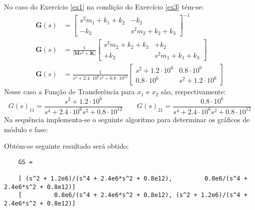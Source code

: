 \documentclass{article}
\begin{document}
\begin{resolution}
    No caso do Exercício \ref{ex1} na condição do Exercício \ref{ex3} tém-se:
    \begin{align*}
        \mathbf{G}(s) &= \begin{bmatrix} s^2 m_1 + k_1 + k_2 & -k_2\\ -k_2 & s^2 m_2 + k_2 + k_3\end{bmatrix}^{-1}\\
        \mathbf{G}(s) &= 
        \frac{1}{|\mathbf{M}s^2 + \mathbf{K}|}
        \begin{bmatrix} s^2 m_2 + k_2 + k_3 & +k_2\\ +k_2 & s^2 m_1 + k_1 + k_3\end{bmatrix}\\
        \mathbf{G}(s) &= 
        \frac{1}{s^4 + 2.4\cdot 10^6 s^2 + 0.8\cdot 10^{12}}
        \begin{bmatrix} s^2 + 1.2\cdot 10^6 & 0.8\cdot 10^6\\ 0.8\cdot 10^6 & s^2 + 1.2\cdot 10^6\end{bmatrix}
    \end{align*}
    Nesse caso a Função de Transferência para $x_1$ e $x_2$ são, respectivamente:
    \begin{equation*}
        \boxed{G(s)_{11} = \frac{s^2 + 1.2\cdot 10^6}{s^4 + 2.4\cdot 10^6 s^2 + 0.8\cdot 10^{12}}}
        \qquad
        \boxed{G(s)_{21} = \frac{      0.8\cdot 10^6}{s^4 + 2.4\cdot 10^6 s^2 + 0.8\cdot 10^{12}}}
    \end{equation*}
    Na sequência implementa-se o seguinte algoritmo para determinar os gráficos de módulo e fase:
    \begin{scriptsize}
        \myMatlab
    \end{scriptsize}
    Obtém-se seguinte resultado será obtido:
    \begin{scriptsize}
        \myMatlab\begin{lstlisting}
    GS =

    [ (s^2 + 1.2e6)/(s^4 + 2.4e6*s^2 + 0.8e12),         0.8e6/(s^4 + 2.4e6*s^2 + 0.8e12)]
    [         0.8e6/(s^4 + 2.4e6*s^2 + 0.8e12), (s^2 + 1.2e6)/(s^4 + 2.4e6*s^2 + 0.8e12)]
    \end{lstlisting}
    \end{scriptsize}
\end{resolution}
\end{document}
